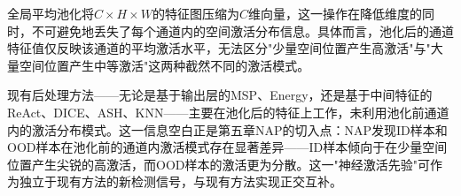 全局平均池化将$C \times H \times W$的特征图压缩为$C$维向量，这一操作在降低维度的同时，不可避免地丢失了每个通道内的空间激活分布信息。具体而言，池化后的通道特征值仅反映该通道的平均激活水平，无法区分"少量空间位置产生高激活"与"大量空间位置产生中等激活"这两种截然不同的激活模式。

现有后处理方法——无论是基于输出层的MSP\cite{hendrycks2016msp}、Energy\cite{liu2020energy}，还是基于中间特征的ReAct\cite{sun2021react}、DICE\cite{sun2022dice}、ASH\cite{djurisic2022extremely}、KNN\cite{sun2022knn}——主要在池化后的特征上工作，未利用池化前通道内的激活分布模式。这一信息空白正是第五章NAP的切入点：NAP发现ID样本和OOD样本在池化前的通道内激活模式存在显著差异——ID样本倾向于在少量空间位置产生尖锐的高激活，而OOD样本的激活更为分散。这一"神经激活先验"可作为独立于现有方法的新检测信号，与现有方法实现正交互补。
